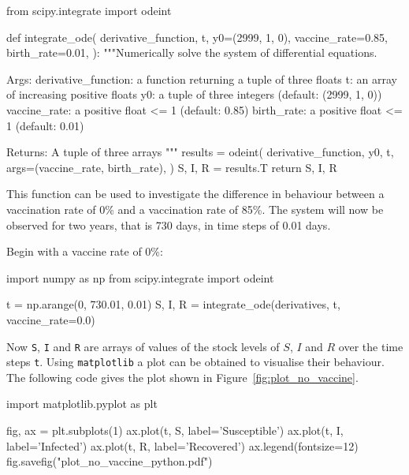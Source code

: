 \begin{pyin}
from scipy.integrate import odeint


def integrate_ode(
    derivative_function,
    t,
    y0=(2999, 1, 0),
    vaccine_rate=0.85,
    birth_rate=0.01,
):
    """Numerically solve the system of differential equations.

    Args:
        derivative_function: a function returning a tuple
                             of three floats
        t: an array of increasing positive floats
        y0: a tuple of three integers (default: (2999, 1, 0))
        vaccine_rate: a positive float <= 1 (default: 0.85)
        birth_rate: a positive float <= 1 (default: 0.01)

    Returns:
        A tuple of three arrays
    """
    results = odeint(
        derivative_function,
        y0,
        t,
        args=(vaccine_rate, birth_rate),
    )
    S, I, R = results.T
    return S, I, R
\end{pyin}

This function can be used to investigate the difference in behaviour between a
vaccination rate of 0\% and a vaccination rate of 85\%. The system will now be
observed for two years, that is 730 days, in time steps of 0.01 days.

Begin with a vaccine rate of 0\%:

\begin{pyin}
import numpy as np
from scipy.integrate import odeint

t = np.arange(0, 730.01, 0.01)
S, I, R = integrate_ode(derivatives, t, vaccine_rate=0.0)
\end{pyin}

Now \texttt{S}, \texttt{I} and \texttt{R}
are arrays of values of the stock levels of $S$, $I$ and $R$ over the time
steps \texttt{t}.
Using \texttt{matplotlib} a plot can be obtained to visualise their
behaviour.
The following code gives the plot shown in Figure~\ref{fig:plot_no_vaccine}.


\begin{pyin-no-test}
import matplotlib.pyplot as plt

fig, ax = plt.subplots(1)
ax.plot(t, S, label='Susceptible')
ax.plot(t, I, label='Infected')
ax.plot(t, R, label='Recovered')
ax.legend(fontsize=12)
fig.savefig("plot_no_vaccine_python.pdf")
\end{pyin-no-test}


